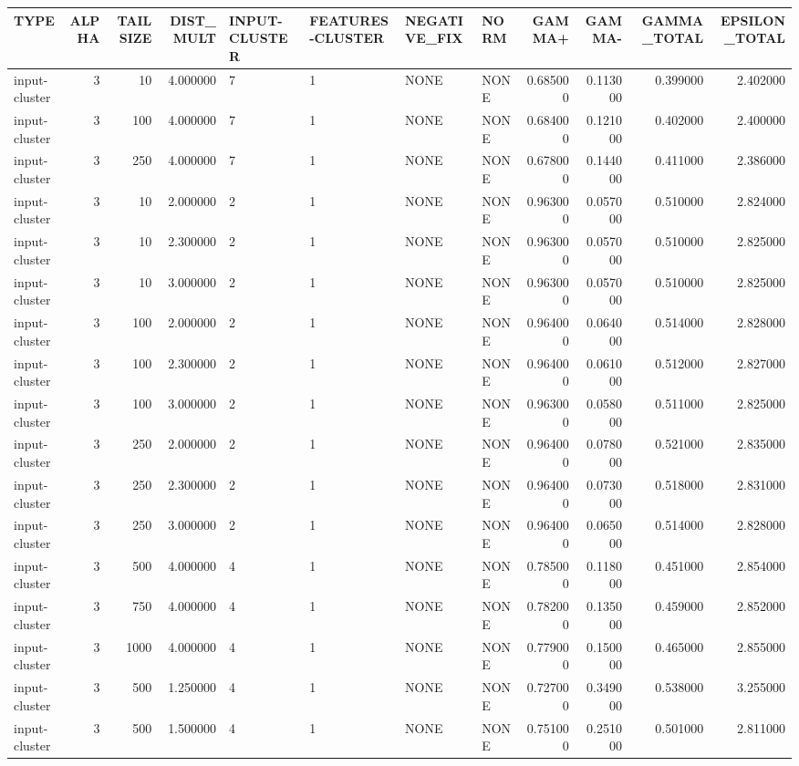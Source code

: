 \begin{tabular}{lrrrllllrrrr}
\toprule
TYPE & ALPHA & TAILSIZE & DIST_MULT & INPUT-CLUSTER & FEATURES-CLUSTER & NEGATIVE_FIX & NORM & GAMMA+ & GAMMA- & GAMMA_TOTAL & EPSILON_TOTAL \\
\midrule
input-cluster & 3 & 10 & 4.000000 & 7 & 1 & NONE & NONE & 0.685000 & 0.113000 & 0.399000 & 2.402000 \\
input-cluster & 3 & 100 & 4.000000 & 7 & 1 & NONE & NONE & 0.684000 & 0.121000 & 0.402000 & 2.400000 \\
input-cluster & 3 & 250 & 4.000000 & 7 & 1 & NONE & NONE & 0.678000 & 0.144000 & 0.411000 & 2.386000 \\
input-cluster & 3 & 10 & 2.000000 & 2 & 1 & NONE & NONE & 0.963000 & 0.057000 & 0.510000 & 2.824000 \\
input-cluster & 3 & 10 & 2.300000 & 2 & 1 & NONE & NONE & 0.963000 & 0.057000 & 0.510000 & 2.825000 \\
input-cluster & 3 & 10 & 3.000000 & 2 & 1 & NONE & NONE & 0.963000 & 0.057000 & 0.510000 & 2.825000 \\
input-cluster & 3 & 100 & 2.000000 & 2 & 1 & NONE & NONE & 0.964000 & 0.064000 & 0.514000 & 2.828000 \\
input-cluster & 3 & 100 & 2.300000 & 2 & 1 & NONE & NONE & 0.964000 & 0.061000 & 0.512000 & 2.827000 \\
input-cluster & 3 & 100 & 3.000000 & 2 & 1 & NONE & NONE & 0.963000 & 0.058000 & 0.511000 & 2.825000 \\
input-cluster & 3 & 250 & 2.000000 & 2 & 1 & NONE & NONE & 0.964000 & 0.078000 & 0.521000 & 2.835000 \\
input-cluster & 3 & 250 & 2.300000 & 2 & 1 & NONE & NONE & 0.964000 & 0.073000 & 0.518000 & 2.831000 \\
input-cluster & 3 & 250 & 3.000000 & 2 & 1 & NONE & NONE & 0.964000 & 0.065000 & 0.514000 & 2.828000 \\
input-cluster & 3 & 500 & 4.000000 & 4 & 1 & NONE & NONE & 0.785000 & 0.118000 & 0.451000 & 2.854000 \\
input-cluster & 3 & 750 & 4.000000 & 4 & 1 & NONE & NONE & 0.782000 & 0.135000 & 0.459000 & 2.852000 \\
input-cluster & 3 & 1000 & 4.000000 & 4 & 1 & NONE & NONE & 0.779000 & 0.150000 & 0.465000 & 2.855000 \\
input-cluster & 3 & 500 & 1.250000 & 4 & 1 & NONE & NONE & 0.727000 & 0.349000 & 0.538000 & 3.255000 \\
input-cluster & 3 & 500 & 1.500000 & 4 & 1 & NONE & NONE & 0.751000 & 0.251000 & 0.501000 & 2.811000 \\

\end{tabular}

